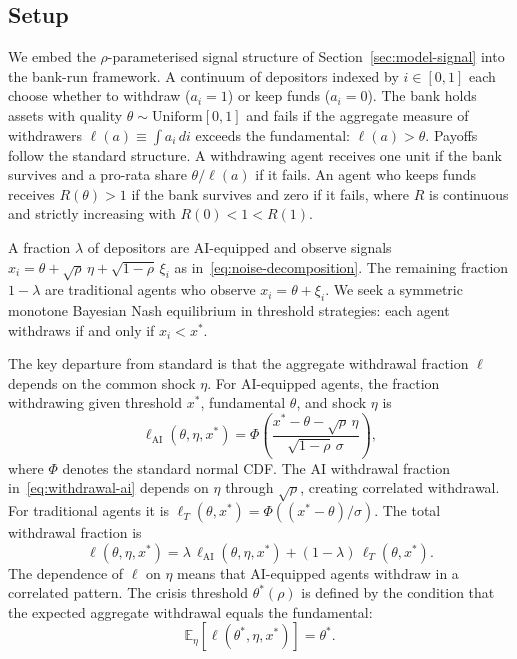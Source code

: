 \label{sec:channel1}

\subsection{Setup}

We embed the $\rho$-parameterised signal structure of Section~\ref{sec:model-signal} into the \citet{goldstein2005} bank-run framework. A continuum of depositors indexed by $i \in [0,1]$ each choose whether to withdraw ($a_i = 1$) or keep funds ($a_i = 0$). The bank holds assets with quality $\theta \sim \mathrm{Uniform}[0,1]$ and fails if the aggregate measure of withdrawers $\ell(a) \equiv \int a_i \, di$ exceeds the fundamental: $\ell(a) > \theta$. Payoffs follow the standard \citet{goldstein2005} structure. A withdrawing agent receives one unit if the bank survives and a pro-rata share $\theta/\ell(a)$ if it fails. An agent who keeps funds receives $R(\theta) > 1$ if the bank survives and zero if it fails, where $R$ is continuous and strictly increasing with $R(0) < 1 < R(1)$.

A fraction $\lambda$ of depositors are AI-equipped and observe signals $x_i = \theta + \sqrt{\rho}\,\eta + \sqrt{1-\rho}\,\xi_i$ as in~\eqref{eq:noise-decomposition}. The remaining fraction $1-\lambda$ are traditional agents who observe $x_i = \theta + \xi_i$. We seek a symmetric monotone Bayesian Nash equilibrium in threshold strategies: each agent withdraws if and only if $x_i < x^*$.

The key departure from standard \citet{goldstein2005} is that the aggregate withdrawal fraction $\ell$ depends on the common shock $\eta$. For AI-equipped agents, the fraction withdrawing given threshold $x^*$, fundamental $\theta$, and shock $\eta$ is
\begin{equation}\label{eq:withdrawal-ai}
  \ell_{\text{AI}}(\theta, \eta, x^*) = \Phi\!\left(\frac{x^* - \theta - \sqrt{\rho}\,\eta}{\sqrt{1-\rho}\,\sigma}\right),
\end{equation}
where $\Phi$ denotes the standard normal CDF. The AI withdrawal fraction in~\eqref{eq:withdrawal-ai} depends on $\eta$ through $\sqrt{\rho}$, creating correlated withdrawal. For traditional agents it is $\ell_T(\theta, x^*) = \Phi((x^*-\theta)/\sigma)$. The total withdrawal fraction is
\begin{equation}\label{eq:withdrawal-total}
  \ell(\theta, \eta, x^*) = \lambda\,\ell_{\text{AI}}(\theta, \eta, x^*) + (1-\lambda)\,\ell_T(\theta, x^*).
\end{equation}
The dependence of $\ell$ on $\eta$ means that AI-equipped agents withdraw in a correlated pattern. The crisis threshold $\theta^*(\rho)$ is defined by the condition that the expected aggregate withdrawal equals the fundamental:
\begin{equation}\label{eq:crisis-threshold}
  \mathbb{E}_\eta\!\left[\ell(\theta^*, \eta, x^*)\right] = \theta^*.
\end{equation}

